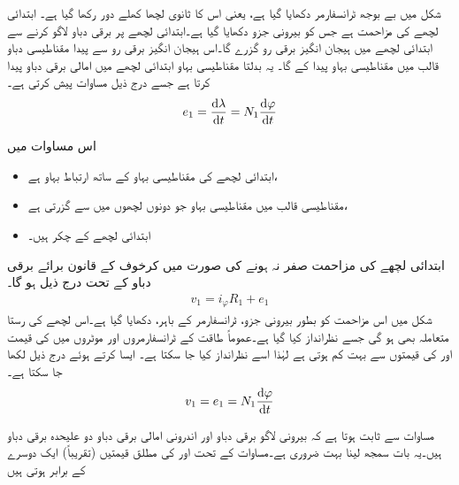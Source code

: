 شکل   میں بے بوجھ ٹرانسفارمر دکھایا گیا ہے، یعنی اس کا ثانوی لچھا  کھلے دور رکھا گیا ہے۔ ابتدائی لچھے کی مزاحمت  ہے جس کو بیرونی جزو دکھایا گیا ہے۔ابتدائی لچھے پر  برقی دباو لاگو کرنے سے ابتدائی لچھے میں ہیجان انگیز برقی رو  گزرے گا۔اس ہیجان انگیز برقی رو سے پیدا مقناطیسی دباو   قالب میں مقناطیسی بہاو   پیدا کے گا۔ یہ بدلتا مقناطیسی بہاو ابتدائی لچھے میں امالی برقی  دباو   پیدا کرتا ہے جسے درج ذیل مساوات پیش کرتی ہے۔
\begin{align}
e_1=\frac{\dif \lambda}{\dif t}=N_1 \frac{\dif \varphi}{\dif t}
\end{align}

 اس مساوات میں
\begin{itemize}
\item
{} ابتدائی لچھے کی مقناطیسی بہاو کے ساتھ ارتباط بہاو ہے،
\item
{} مقناطیسی قالب میں مقناطیسی بہاو جو دونوں لچھوں میں سے گزرتی ہے،
\item
{} ابتدائی لچھے کے چکر ہیں۔
\end{itemize}
%

ابتدائی لچھے کی مزاحمت  صفر نہ ہونے کی صورت میں کرخوف کے قانون برائے برقی دباو کے تحت درج ذیل ہو گا۔
\begin{align}\label{مساوات_ٹرانسفارمر_بیرونی_اندرونی_دباو_فرق}
v_1 = i_{\varphi} R_1+e_1
\end{align}
شکل  میں اس مزاحمت کو بطور بیرونی جزو، ٹرانسفارمر کے باہر، دکھایا گیا ہے۔اس لچھے کی رستا متعاملہ بھی ہو گی جسے نظرانداز کیا گیا ہے۔عموماً طاقت کے ٹرانسفارمروں اور موٹروں  میں  کی قیمت  اور  کی قیمتوں سے بہت کم ہوتی ہے لہٰذا اسے نظرانداز کیا جا سکتا ہے۔ ایسا کرتے ہوئے درج ذیل لکھا جا سکتا ہے۔
\begin{align}\label{مساوات_ٹرانسفارمر_بیرونی_اندرونی_دباو_تقریبا_برابر}
v_1 = e_1=N_1 \frac{\dif \varphi}{\dif t}
\end{align}

مساوات  سے  ثابت ہوتا ہے کہ بیرونی لاگو برقی دباو  اور اندرونی امالی برقی دباو  دو علیحدہ برقی دباو ہیں۔یہ بات سمجھ لینا بہت ضروری ہے۔مساوات  کے تحت  اور  کی مطلق قیمتیں  (تقریباً) ایک دوسرے کے برابر ہوتی ہیں

